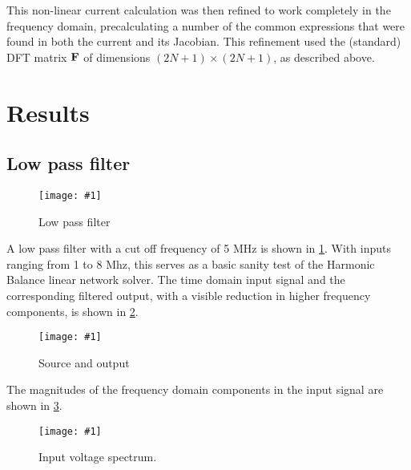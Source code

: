 \documentclass[12pt,journal,compsoc]{../ieeepaper/IEEEtran}
\newcommand{\imageFigureHere}[4]{%
\begin{figure}[!h]%
\centering%
\texttt{[image: \#1]}%
\caption{#2}%
\label{#3}%
\end{figure}%
}
\begin{document}
This non-linear current calculation was then refined to work completely in the frequency domain, precalculating a number of the common expressions that were found in both the current and its Jacobian.  This refinement used the (standard) DFT matrix \( \mathbf{F} \) of dimensions \( (2 N + 1 ) \times (2 N + 1 ) \), as described above.

\section{Results}

\subsection{Low pass filter}


\imageFigureHere{../../figures/ece1254/report/lowPassFilterFig1}{Low pass filter}{fig:lowPassFilterFig1}{3.0in}

A low pass filter with a cut off frequency of 5 MHz is shown in 
\cref{fig:lowPassFilterFig1}.
With 
inputs 
ranging from 1 to 8 Mhz, this serves as a basic sanity test of the Harmonic Balance linear network solver.
The time domain input signal and the corresponding filtered output, with a visible reduction in higher frequency components, 
is shown in \cref{fig:lowPassFilterFig2}.  

\imageFigureHere{../../figures/ece1254/report/lowPassFilterSourceAndOutputVoltagesFig2}{Source and output}{fig:lowPassFilterFig2}{3.0in}

The magnitudes of the frequency domain components in the input signal are shown in \cref{fig:lowPassFilterFig3}.

\imageFigureHere{../../figures/ece1254/report/lowPassFilterInputVoltageSpectrumFig3}{Input voltage spectrum.}{fig:lowPassFilterFig3}{3.0in}
\end{document}
